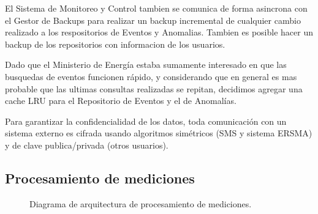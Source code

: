 \documentclass{article}
\theoremstyle{definition}
\theoremstyle{remark}
\begin{document}
El Sistema de Monitoreo y Control tambien se comunica de forma asincrona con el Gestor de Backups para realizar un backup incremental de cualquier cambio realizado a los respositorios de Eventos y Anomalias. Tambien es posible hacer un backup de los repositorios con informacion de los usuarios.

Dado que el Ministerio de Energía estaba sumamente interesado en que las busquedas de eventos funcionen rápido, y considerando que en general es mas probable que las ultimas consultas realizadas se repitan, decidimos agregar una cache LRU para el Repositorio de Eventos y el de Anomalías.

Para garantizar la confidencialidad de los datos, toda comunicación con un sistema externo es cifrada usando algoritmos simétricos (SMS y sistema ERSMA) y de clave publica/privada (otros usuarios).

\subsection{Procesamiento de mediciones}  \label{procesador_mediciones}

\begin{figure}[H]
  \caption{Diagrama de arquitectura de procesamiento de mediciones.}
\end{figure}
\end{document}
